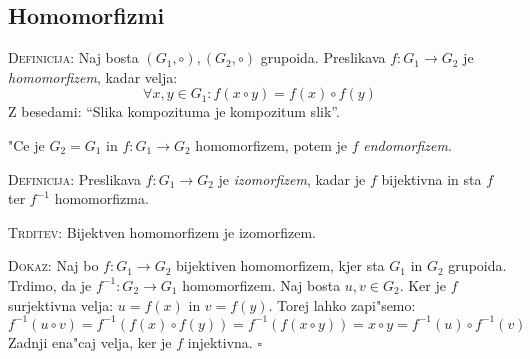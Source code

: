 \subsection{Homomorfizmi}
\textsc{Definicija:} Naj bosta $(G_1, \circ), (G_2, \circ)$ grupoida. Preslikava $f: G_1 \to G_2$ je \emph{homomorfizem}, kadar velja:
\begin{equation*}
\forall x, y \in G_1: f(x \circ y) = f(x) \circ f(y)
\end{equation*}
Z besedami: ``Slika kompozituma je kompozitum slik''.

"Ce je $G_2 = G_1$ in $f: G_1 \to G_2$ homomorfizem, potem je $f$ \emph{endomorfizem}.

\textsc{Definicija:} Preslikava $f: G_1 \to G_2$ je \emph{izomorfizem}, kadar je $f$ bijektivna in sta $f$ ter $f^{-1}$ homomorfizma.

\textsc{Trditev:} Bijektven homomorfizem je izomorfizem.

\textsc{Dokaz:} Naj bo $f: G_1 \to G_2$ bijektiven homomorfizem, kjer sta $G_1$ in $G_2$ grupoida. Trdimo, da je $f^{-1}: G_2 \to G_1$ homomorfizem. Naj bosta $u, v \in G_2$. Ker je $f$ surjektivna velja: $u = f(x)$ in $v = f(y)$. Torej lahko zapi"semo:
\begin{equation*}
f^{-1}(u \circ v) = f^{-1}(f(x) \circ f(y)) = f^{-1}(f(x \circ y)) = x \circ y = f^{-1}(u) \circ f^{-1}(v)
\end{equation*}
Zadnji ena"caj velja, ker je $f$ injektivna. \hfill $\square$

